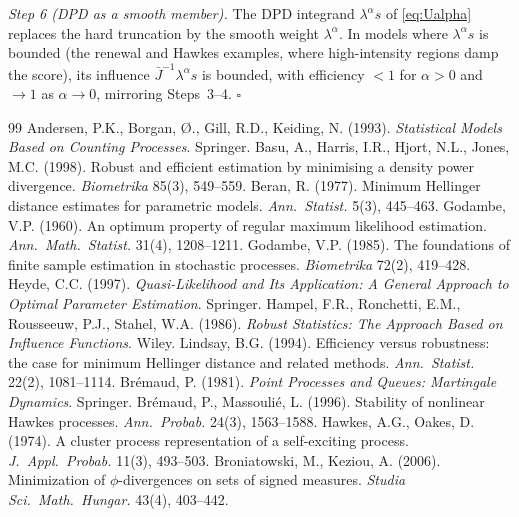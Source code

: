 \documentclass[11pt]{article}
\begin{document}
\emph{Step 6 (DPD as a smooth member).} The DPD integrand $\lambda^\alpha s$ of
\eqref{eq:Ualpha} replaces the hard truncation by the smooth weight $\lambda^\alpha$.
In models where $\lambda^\alpha s$ is bounded (the renewal and Hawkes examples,
where high-intensity regions damp the score), its influence
$\bar J^{-1}\lambda^\alpha s$ is bounded, with efficiency $<1$ for $\alpha>0$ and
$\to1$ as $\alpha\to0$, mirroring Steps~3--4. \hfill$\square$

\begin{thebibliography}{99}
 Andersen, P.K., Borgan, \O., Gill, R.D., Keiding, N. (1993). \textit{Statistical Models Based on Counting Processes}. Springer.
 Basu, A., Harris, I.R., Hjort, N.L., Jones, M.C. (1998). Robust and efficient estimation by minimising a density power divergence. \textit{Biometrika} 85(3), 549--559.
 Beran, R. (1977). Minimum Hellinger distance estimates for parametric models. \textit{Ann.\ Statist.} 5(3), 445--463.
 Godambe, V.P. (1960). An optimum property of regular maximum likelihood estimation. \textit{Ann.\ Math.\ Statist.} 31(4), 1208--1211.
 Godambe, V.P. (1985). The foundations of finite sample estimation in stochastic processes. \textit{Biometrika} 72(2), 419--428.
 Heyde, C.C. (1997). \textit{Quasi-Likelihood and Its Application: A General Approach to Optimal Parameter Estimation}. Springer.
 Hampel, F.R., Ronchetti, E.M., Rousseeuw, P.J., Stahel, W.A. (1986). \textit{Robust Statistics: The Approach Based on Influence Functions}. Wiley.
 Lindsay, B.G. (1994). Efficiency versus robustness: the case for minimum Hellinger distance and related methods. \textit{Ann.\ Statist.} 22(2), 1081--1114.
 Br\'emaud, P. (1981). \textit{Point Processes and Queues: Martingale Dynamics}. Springer.
 Br\'emaud, P., Massouli\'e, L. (1996). Stability of nonlinear Hawkes processes. \textit{Ann.\ Probab.} 24(3), 1563--1588.
 Hawkes, A.G., Oakes, D. (1974). A cluster process representation of a self-exciting process. \textit{J.\ Appl.\ Probab.} 11(3), 493--503.
 Broniatowski, M., Keziou, A. (2006). Minimization of $\phi$-divergences on sets of signed measures. \textit{Studia Sci.\ Math.\ Hungar.} 43(4), 403--442.

\end{thebibliography}
\end{document}
